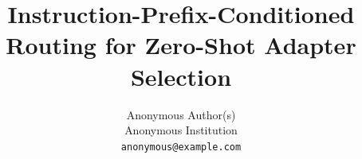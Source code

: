 \documentclass{article}
\title{Instruction-Prefix-Conditioned Routing for Zero-Shot Adapter Selection}
\author{
  Anonymous Author(s) \\
  Anonymous Institution \\
  \texttt{anonymous@example.com}
}
\date{}
\begin{document}
\maketitle

\begin{abstract}

\end{abstract}












\end{document}

